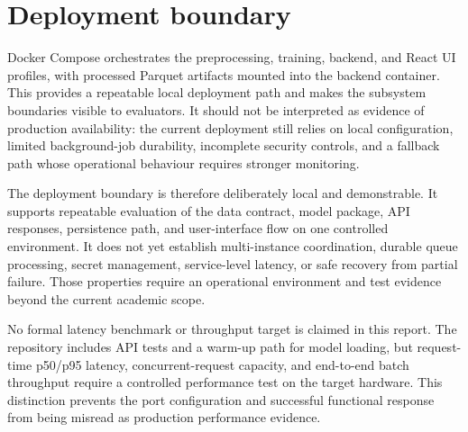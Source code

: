 \section{Deployment boundary}

Docker Compose orchestrates the preprocessing, training, backend, and React UI profiles, with processed Parquet artifacts mounted into the backend container. This provides a repeatable local deployment path and makes the subsystem boundaries visible to evaluators. It should not be interpreted as evidence of production availability: the current deployment still relies on local configuration, limited background-job durability, incomplete security controls, and a fallback path whose operational behaviour requires stronger monitoring.

The deployment boundary is therefore deliberately local and demonstrable. It
supports repeatable evaluation of the data contract, model package, API
responses, persistence path, and user-interface flow on one controlled
environment. It does not yet establish multi-instance coordination, durable
queue processing, secret management, service-level latency, or safe recovery
from partial failure. Those properties require an operational environment and
test evidence beyond the current academic scope.

No formal latency benchmark or throughput target is claimed in this report.
The repository includes API tests and a warm-up path for model loading, but
request-time p50/p95 latency, concurrent-request capacity, and end-to-end
batch throughput require a controlled performance test on the target hardware.
This distinction prevents the port configuration and successful functional
response from being misread as production performance evidence.
